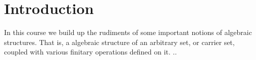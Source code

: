 
\section{Introduction} %
\label{sec:introduction}
In this course we build up the rudiments of some important notions of algebraic structures.
That is, a algebraic structure of an arbitrary set, or carrier set, coupled with various finitary operations defined on it.
..


